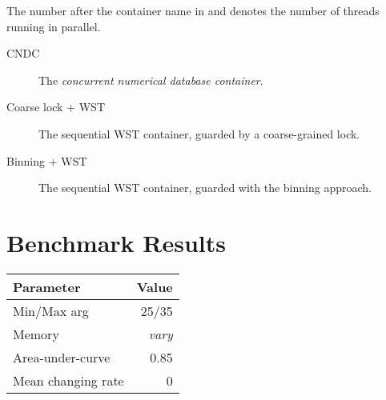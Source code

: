 The number after the container name in  and  denotes the number of threads running in parallel.

\begin{description}
\item[CNDC] The \emph{concurrent numerical database container}.
\item[Coarse lock + WST] The sequential WST container, guarded by a coarse-grained lock.
\item[Binning + WST] The sequential WST container, guarded with the binning approach.

\end{description}




\chapter{Benchmark Results}
\label{ch:bresult}
\pagebreak
\begin{tabular}[h]{l r} \toprule
Parameter & Value \\ \midrule
Min/Max arg & 25/35 \\
Memory & \emph{vary} \\
Area-under-curve & 0.85 \\
Mean changing rate & 0 \\ \bottomrule
\end{tabular}

